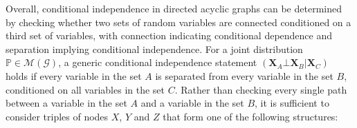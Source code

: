 \documentclass{report}
\begin{document}
\noindent Overall, conditional independence in directed acyclic graphs can be determined by checking whether two sets of random variables are connected conditioned on a third set of variables, with connection indicating conditional dependence and separation implying conditional independence. \newline
For a joint distribution $\displaystyle \mathbb{P} \in \mathcal{M}(\mathcal{G})$, a generic conditional independence statement $\displaystyle (\mathbf{X}_A \bot \mathbf{X}_B|\mathbf{X}_C)$ holds if every variable in the set $\displaystyle A$ is separated from every variable in the set $\displaystyle B$, conditioned on all variables in the set $\displaystyle C$. \newline
Rather than checking every single path between a variable in the set $\displaystyle A$ and a variable in the set $\displaystyle B$, it is sufficient to consider triples of nodes $\displaystyle X$, $\displaystyle Y$ and $\displaystyle Z$ that form one of the following structures:
\end{document}
